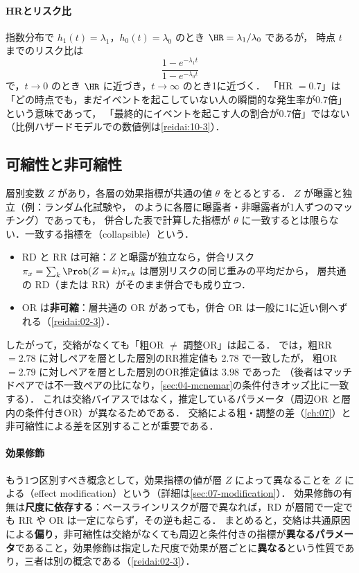 \paragraph{HRとリスク比}
指数分布で $h_1(t)=\lambda_1$，$h_0(t)=\lambda_0$ のとき $\HR=\lambda_1/\lambda_0$ であるが，
時点 $t$ までのリスク比は
\[
\frac{1-e^{-\lambda_1t}}{1-e^{-\lambda_0t}}
\]
で，$t\to0$ のとき $\HR$ に近づき，$t\to\infty$ のとき1に近づく．
「HR $=0.7$」は「どの時点でも，まだイベントを起こしていない人の瞬間的な発生率が0.7倍」という意味であって，
「最終的にイベントを起こす人の割合が0.7倍」ではない（比例ハザードモデルでの数値例は\cref{reidai:10-3}）．

\subsection{可縮性と非可縮性}\label{subsec:02-collapse}
\Youchui 層別変数 $Z$ があり，各層の効果指標が共通の値 $\theta$ をとるとする．
$Z$ が曝露と独立（例：ランダム化試験や， のように各層に曝露者・非曝露者が1人ずつのマッチング）であっても，
併合した表で計算した指標が $\theta$ に一致するとは限らない．一致する指標を（collapsible）という．
\begin{itemize}
\item RD と RR は可縮：$Z$ と曝露が独立なら，併合リスク $\pi_x=\sum_k\Prob(Z=k)\pi_{xk}$ は層別リスクの同じ重みの平均だから，
      層共通の RD（または RR）がそのまま併合でも成り立つ．
\item OR は\textbf{非可縮}：層共通の OR があっても，併合 OR は一般に1に近い側へずれる（\cref{reidai:02-3}）．
\end{itemize}
したがって，交絡がなくても「粗OR $\ne$ 調整OR」は起こる．
 では，粗RR $=2.78$ に対しペアを層とした層別のRR推定値も $2.78$ で一致したが，
粗OR $=2.79$ に対しペアを層とした層別のOR推定値は $3.98$ であった
（後者はマッチドペアでは不一致ペアの比になり，\cref{sec:04-mcnemar}の条件付きオッズ比に一致する）．
これは交絡バイアスではなく，推定しているパラメータ（周辺OR と層内の条件付きOR）が異なるためである．
交絡による粗・調整の差（\cref{ch:07}）と非可縮性による差を区別することが重要である．

\paragraph{効果修飾}
もう1つ区別すべき概念として，効果指標の値が層 $Z$ によって異なることを $Z$ による（effect modification）という（詳細は\cref{sec:07-modification}）．
効果修飾の有無は\textbf{尺度に依存する}：ベースラインリスクが層で異なれば，RD が層間で一定でも RR や OR は一定にならず，その逆も起こる．
まとめると，交絡は共通原因による\textbf{偏り}，非可縮性は交絡がなくても周辺と条件付きの指標が\textbf{異なるパラメータ}であること，効果修飾は指定した尺度で効果が層ごとに\textbf{異なる}という性質であり，三者は別の概念である（\cref{reidai:02-3}）．

